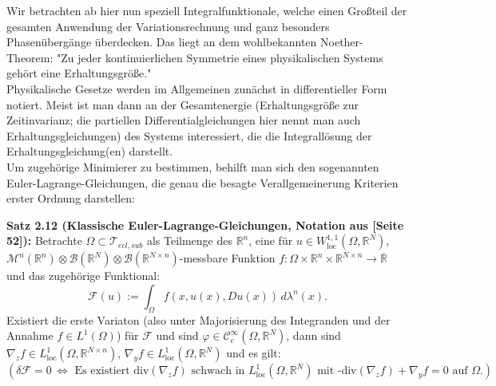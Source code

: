 Wir betrachten ab hier nun speziell Integralfunktionale, welche einen Großteil der \\gesamten Anwendung der Variationsrechnung und ganz besonders Phasenübergänge überdecken. Das liegt an dem wohlbekannten Noether-Theorem: "Zu jeder kontinuierlichen Symmetrie eines physikalischen Systems gehört eine Erhaltungsgröße." \\Physikalische Gesetze werden im Allgemeinen zunächst in differentieller Form notiert. Meist ist man dann an der Gesamtenergie (Erhaltungsgröße zur Zeitinvarianz; die partiellen Differentialgleichungen hier nennt man auch Erhaltungsgleichungen) des Systems interessiert, die die Integrallösung der Erhaltungsgleichung(en) darstellt. \\Um zugehörige Minimierer zu bestimmen, behilft man sich den sogenannten Euler-Lagrange-Gleichungen, die genau die besagte Verallgemeinerung Kriterien erster Ordnung darstellen:\\[0.5cm]
\colorbox{generalYellow}{\begin{minipage}{16cm}{\textcolor{black}{}{\label{theo2.12}}}
\textbf{Satz 2.12 (Klassische Euler-Lagrange-Gleichungen, Notation aus \cite{CalcVarSchmidt}[Seite 52]):} Betrachte \(\Omega \subset \mathcal{T}_{ecl,sub}\) als Teilmenge des \(\mathbb{R}^n\), eine für \(u\in W^{1,1}_{\text{loc}}(\Omega,\mathbb{R}^N)\), \(\mathcal{M}^n(\mathbb{R}^n) \otimes \mathcal{B}(\mathbb{R}^N) \otimes \mathcal{B}(\mathbb{R}^{N \times n})\)-messbare Funktion \(f:\Omega \times \mathbb{R}^n \times \mathbb{R}^{N \times n} \to \overline{\mathbb{R}}\) und das zugehörige Funktional:
\begin{equation}
    \mathcal{F}(u) := \int_{\Omega} f(x,u(x),Du(x)) \, d\lambda^n(x).
\end{equation}
Existiert die erste Variaton (also unter Majorisierung des Integranden und der Annahme \(f \in L^1(\Omega)\)) für \(\mathcal{F}\) und sind \(\varphi \in \mathcal{C}^{\infty}_c(\Omega,\mathbb{R}^N)\), dann sind \(\nabla_z f \in L^1_{\text{loc}} (\Omega, \mathbb{R}^{N \times n}), \, \nabla_y f \in L^1_{\text{loc}}(\Omega,\mathbb{R}^N)\) und es gilt:
\begin{equation}
    (\delta \mathcal{F} = 0 \, \Leftrightarrow \text{ Es existiert div}(\nabla_z f) \text{ schwach in } L^1_{\text{loc}}(\Omega,\mathbb{R}^N) \text{ mit -div}(\nabla_z f) + \nabla_y f = 0 \text{ auf }\Omega.)  
\end{equation}
\end{minipage}}\\

